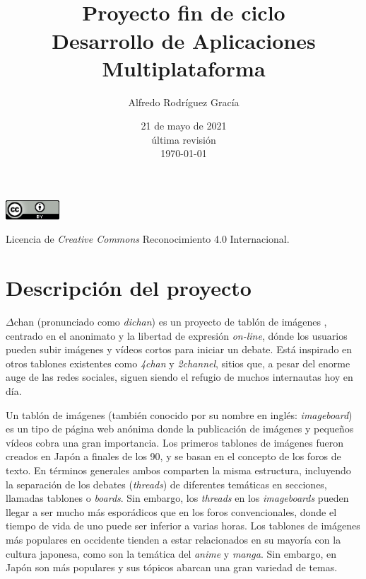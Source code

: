 \documentclass[12pt,a4paper,titlepage]{article}
\title{\projectname\\\bigskip\normalsize{Proyecto fin de ciclo\\Desarrollo de Aplicaciones Multiplataforma}}
\author{Alfredo Rodríguez Gracía}
\date{21 de mayo de 2021\\\bigskip\scriptsize{última revisión\\\today}}
\newcommand\projectname{$\Delta$chan}
\begin{document}
    \maketitle
    \tableofcontents
    \vspace{\fill}
    \begin{center}
        \includegraphics[width=0.15\textwidth]{media/cc-by-large.png}

        Licencia de \textit{Creative Commons} Reconocimiento 4.0 Internacional.
    \end{center}
    \newpage

    \section{Descripción del proyecto}



    {\projectname} (pronunciado como \textit{dichan}) es un proyecto de tablón de imágenes \cite{wiki:imageboard}, centrado en el anonimato y la libertad de expresión \textit{on-line}, dónde los usuarios pueden subir imágenes y vídeos cortos para iniciar un debate. Está inspirado en otros tablones existentes como \emph{4chan} y \emph{2channel}, sitios que, a pesar del enorme auge de las redes sociales, siguen siendo el refugio de muchos internautas hoy en día.

    Un tablón de imágenes (también conocido por su nombre en inglés: \textit{imageboard}) es un tipo de página web anónima donde la publicación de imágenes y pequeños vídeos cobra una gran importancia. Los primeros tablones de imágenes fueron creados en Japón a finales de los 90, y se basan en el concepto de los foros de texto. En términos generales ambos comparten la misma estructura, incluyendo la separación de los debates (\textit{threads}) de diferentes temáticas en secciones, llamadas tablones o \textit{boards}. Sin embargo, los \textit{threads} en los \textit{imageboards} pueden llegar a ser mucho más esporádicos que en los foros convencionales, donde el tiempo de vida de uno puede ser inferior a varias horas. Los tablones de imágenes más populares en occidente tienden a estar relacionados en su mayoría con la cultura japonesa, como son la temática del \emph{anime} y \emph{manga}. Sin embargo, en Japón son más populares y sus tópicos abarcan una gran variedad de temas.
\end{document}
